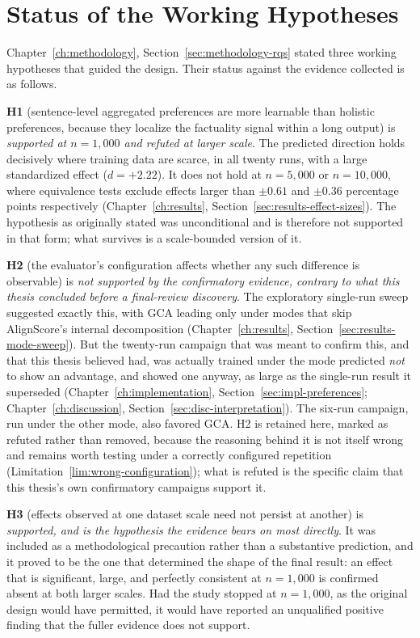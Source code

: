 \section{Status of the Working Hypotheses}
\label{sec:concl-hypotheses}

Chapter~\ref{ch:methodology}, Section~\ref{sec:methodology-rqs} stated three
working hypotheses that guided the design. Their status against the evidence
collected is as follows.

\textbf{H1} (sentence-level aggregated preferences are more learnable than
holistic preferences, because they localize the factuality signal within a long
output) is \emph{supported at $n=1{,}000$ and refuted at larger scale}. The
predicted direction holds decisively where training data are scarce, in all
twenty runs, with a large standardized effect ($d=+2.22$). It does not hold at
$n=5{,}000$ or $n=10{,}000$, where equivalence tests exclude effects larger than
$\pm0.61$ and $\pm0.36$ percentage points respectively
(Chapter~\ref{ch:results}, Section~\ref{sec:results-effect-sizes}). The
hypothesis as originally stated was unconditional and is therefore not supported
in that form; what survives is a scale-bounded version of it.

\textbf{H2} (the evaluator's configuration affects whether any such difference is
observable) is \emph{not supported by the confirmatory evidence, contrary to
what this thesis concluded before a final-review discovery}. The exploratory
single-run sweep suggested exactly this, with GCA leading only under modes
that skip AlignScore's internal decomposition
(Chapter~\ref{ch:results}, Section~\ref{sec:results-mode-sweep}). But the
twenty-run campaign that was meant to confirm this, and that this thesis
believed had, was actually trained under the mode predicted \emph{not} to
show an advantage, and showed one anyway, as large as the single-run result
it superseded (Chapter~\ref{ch:implementation}, Section~\ref{sec:impl-preferences};
Chapter~\ref{ch:discussion}, Section~\ref{sec:disc-interpretation}). The
six-run campaign, run under the other mode, also favored GCA. H2 is
retained here, marked as refuted rather than removed, because the reasoning
behind it is not itself wrong and remains worth testing under a correctly
configured repetition (Limitation~\ref{lim:wrong-configuration}); what is
refuted is the specific claim that this thesis's own confirmatory campaigns
support it.

\textbf{H3} (effects observed at one dataset scale need not persist at another)
is \emph{supported, and is the hypothesis the evidence bears on most directly}.
It was included as a methodological precaution rather than a substantive
prediction, and it proved to be the one that determined the shape of the final
result: an effect that is significant, large, and perfectly consistent at
$n=1{,}000$ is confirmed absent at both larger scales. Had the study stopped at
$n=1{,}000$, as the original design would have permitted, it would have reported
an unqualified positive finding that the fuller evidence does not support.

